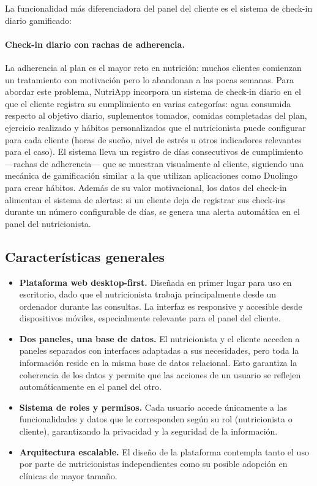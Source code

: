 La funcionalidad más diferenciadora del panel del cliente es el sistema de check-in diario gamificado:

\paragraph{Check-in diario con rachas de adherencia.}
La adherencia al plan es el mayor reto en nutrición: muchos clientes comienzan un tratamiento con motivación pero lo abandonan a las pocas semanas. Para abordar este problema, NutriApp incorpora un sistema de check-in diario en el que el cliente registra su cumplimiento en varias categorías: agua consumida respecto al objetivo diario, suplementos tomados, comidas completadas del plan, ejercicio realizado y hábitos personalizados que el nutricionista puede configurar para cada cliente (horas de sueño, nivel de estrés u otros indicadores relevantes para el caso). El sistema lleva un registro de días consecutivos de cumplimiento ---rachas de adherencia--- que se muestran visualmente al cliente, siguiendo una mecánica de gamificación similar a la que utilizan aplicaciones como Duolingo para crear hábitos. Además de su valor motivacional, los datos del check-in alimentan el sistema de alertas: si un cliente deja de registrar sus check-ins durante un número configurable de días, se genera una alerta automática en el panel del nutricionista.

\subsection{Características generales}

\begin{itemize}
    \item \textbf{Plataforma web desktop-first.} Diseñada en primer lugar para uso en escritorio, dado que el nutricionista trabaja principalmente desde un ordenador durante las consultas. La interfaz es responsive y accesible desde dispositivos móviles, especialmente relevante para el panel del cliente.

    \item \textbf{Dos paneles, una base de datos.} El nutricionista y el cliente acceden a paneles separados con interfaces adaptadas a sus necesidades, pero toda la información reside en la misma base de datos relacional. Esto garantiza la coherencia de los datos y permite que las acciones de un usuario se reflejen automáticamente en el panel del otro.

    \item \textbf{Sistema de roles y permisos.} Cada usuario accede únicamente a las funcionalidades y datos que le corresponden según su rol (nutricionista o cliente), garantizando la privacidad y la seguridad de la información.

    \item \textbf{Arquitectura escalable.} El diseño de la plataforma contempla tanto el uso por parte de nutricionistas independientes como su posible adopción en clínicas de mayor tamaño.
\end{itemize}

